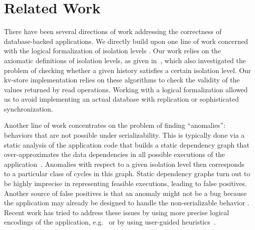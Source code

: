 
\section{Related Work}
\label{sec:app:related}


There have been several directions of work addressing the correctness of database-backed applications. 
We directly build upon one line of work concerned with the logical formalization
of isolation levels 
\cite{ansi,DBLP:conf/icde/AdyaLO00,DBLP:conf/sigmod/BerensonBGMOO95,DBLP:conf/concur/Cerone0G15,DBLP:journals/pacmpl/BiswasE19}.
Our work relies on the axiomatic definitions of isolation levels, as given
in~\cite{DBLP:journals/pacmpl/BiswasE19}, which also investigated
the problem of checking whether a given history satisfies a certain isolation
level. Our kv-store implementation relies on these algorithms 
to check the validity of the values returned by read operations. Working with a
logical formalization allowed us to avoid implementing an actual database with replication or
sophisticated synchronization.

Another line of work concentrates on the problem of finding ``anomalies'': 
behaviors that are not possible under serializability. This is typically done
via a static analysis of the application code that builds a static dependency graph that
over-approximates the data dependencies in all possible
executions of the application~\cite{DBLP:journals/jacm/CeroneG18,DBLP:journals/jacm/CeroneG18,DBLP:conf/concur/0002G16,DBLP:journals/tods/FeketeLOOS05,DBLP:conf/vldb/JorwekarFRS07,DBLP:conf/sigmod/WarszawskiB17,DBLP:journals/pvldb/GanRRB020}.
Anomalies with respect to a given isolation level then corresponds to a
particular class of cycles in this graph. Static dependency graphs turn out to
be highly imprecise in representing feasible executions, leading to false
positives. Another source of false positives is that an anomaly might not be a
bug because the application may already be designed to handle the
non-serializable behavior \cite{DBLP:conf/pldi/BrutschyD0V18,DBLP:journals/pvldb/GanRRB020}. 
Recent work has tried to address these issues by using more precise 
logical encodings of the application,
e.g.~\cite{DBLP:conf/popl/BrutschyD0V17,DBLP:conf/pldi/BrutschyD0V18} or
by using user-guided heuristics~\cite{DBLP:journals/pvldb/GanRRB020}. 

